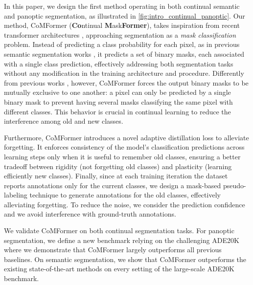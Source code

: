 \documentclass[10pt,twocolumn,letterpaper]{article}
\begin{document}
In this paper, we design the first method operating in both continual semantic and panoptic segmentation, as illustrated in \autoref{fig:intro_continual_panoptic}.
Our method, CoMFormer (\textbf{Co}ntinual \textbf{M}ask\textbf{Former}), takes inspiration from recent transformer architectures \cite{cheng2021maskformer, cheng2021masked}, approaching segmentation as a \textit{mask classification} problem. Instead of predicting a class probability for each pixel, as in previous semantic segmentation works \cite{long2015fcn, chen2017deeplabv3}, it predicts a set of binary masks, each associated with a single class prediction, effectively addressing both segmentation tasks without any modification in the training architecture and procedure. 
Differently from previous works \cite{cheng2021maskformer, cheng2021masked}, however, CoMFormer forces the output binary masks to be mutually exclusive to one another: a pixel can only be predicted by a single binary mask to prevent having several masks classifying the same pixel with different classes. {This behavior is crucial in continual learning to reduce the interference among old and new classes}. 

Furthermore, CoMFormer introduces a novel adaptive distillation loss to alleviate forgetting. It enforces consistency of the model's classification predictions across learning steps only when it is useful to remember old classes, ensuring a better tradeoff between rigidity (not forgetting old classes) and plasticity (learning efficiently new classes).
Finally, since at each training iteration the dataset reports annotations only for the current classes, we design a mask-based pseudo-labeling technique to generate annotations for the old classes, effectively alleviating forgetting. To reduce the noise, we consider the prediction confidence and we avoid interference with ground-truth annotations. 

We validate CoMFormer on both continual segmentation tasks. For panoptic segmentation, we define a new benchmark relying on the challenging ADE20K where we demonstrate that CoMFormer largely outperforms all previous baselines. 
On semantic segmentation, we show that CoMFormer outperforms the existing state-of-the-art methods on every setting of the large-scale ADE20K benchmark. 
\end{document}
